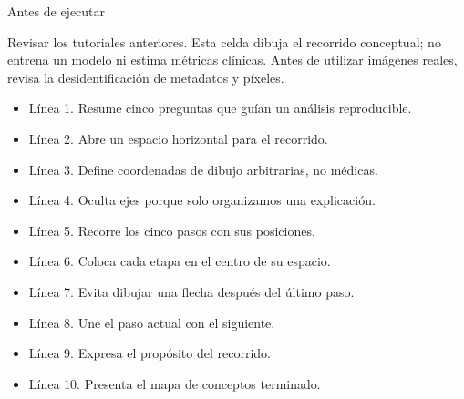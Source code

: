 
\begin{Idea}{Antes de ejecutar}

Revisar los tutoriales anteriores. Esta celda dibuja el recorrido conceptual; no entrena un modelo ni estima métricas clínicas. Antes de utilizar imágenes reales, revisa la desidentificación de metadatos y píxeles.


\end{Idea}



\begin{itemize}

\item Línea 1. Resume cinco preguntas que guían un análisis reproducible.

\item Línea 2. Abre un espacio horizontal para el recorrido.

\item Línea 3. Define coordenadas de dibujo arbitrarias, no médicas.

\item Línea 4. Oculta ejes porque solo organizamos una explicación.

\item Línea 5. Recorre los cinco pasos con sus posiciones.

\item Línea 6. Coloca cada etapa en el centro de su espacio.

\item Línea 7. Evita dibujar una flecha después del último paso.

\item Línea 8. Une el paso actual con el siguiente.

\item Línea 9. Expresa el propósito del recorrido.

\item Línea 10. Presenta el mapa de conceptos terminado.

\end{itemize}

